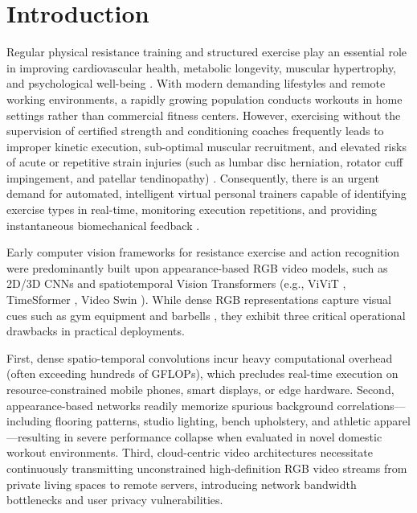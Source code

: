 \documentclass[runningheads]{llncs}
\begin{document}
\begin{abstract}
\end{abstract}


\section{Introduction}

Regular physical resistance training and structured exercise play an essential role in improving cardiovascular health, metabolic longevity, muscular hypertrophy, and psychological well-being \cite{schoenfeld2010}. With modern demanding lifestyles and remote working environments, a rapidly growing population conducts workouts in home settings rather than commercial fitness centers. However, exercising without the supervision of certified strength and conditioning coaches frequently leads to improper kinetic execution, sub-optimal muscular recruitment, and elevated risks of acute or repetitive strain injuries (such as lumbar disc herniation, rotator cuff impingement, and patellar tendinopathy) \cite{riccio2024}. Consequently, there is an urgent demand for automated, intelligent virtual personal trainers capable of identifying exercise types in real-time, monitoring execution repetitions, and providing instantaneous biomechanical feedback \cite{garciadevilla2022}.

Early computer vision frameworks for resistance exercise and action recognition were predominantly built upon appearance-based RGB video models, such as 2D/3D CNNs \cite{donahue2015,carreira2017,feichtenhofer2019} and spatiotemporal Vision Transformers (e.g., ViViT \cite{arnab2021}, TimeSformer \cite{bertasius2021}, Video Swin \cite{liu2022video}). While dense RGB representations capture visual cues such as gym equipment and barbells \cite{ng2015}, they exhibit three critical operational drawbacks in practical deployments.

First, dense spatio-temporal convolutions incur heavy computational overhead (often exceeding hundreds of GFLOPs), which precludes real-time execution on resource-constrained mobile phones, smart displays, or edge hardware. Second, appearance-based networks readily memorize spurious background correlations---including flooring patterns, studio lighting, bench upholstery, and athletic apparel---resulting in severe performance collapse when evaluated in novel domestic workout environments. Third, cloud-centric video architectures necessitate continuously transmitting unconstrained high-definition RGB video streams from private living spaces to remote servers, introducing network bandwidth bottlenecks and user privacy vulnerabilities.
\end{document}
